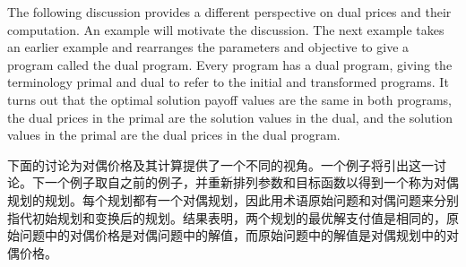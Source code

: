 \begin{original}
The following discussion provides a different perspective on dual prices and their computation. An example will motivate the discussion. The next example takes an earlier example and rearranges the parameters and objective to give a program called the dual program. Every program has a dual program, giving the terminology primal and dual to refer to the initial and transformed programs. It turns out that the optimal solution payoff values are the same in both programs, the dual prices in the primal are the solution values in the dual, and the solution values in the primal are the dual prices in the dual program.
\end{original}
\begin{translation}
下面的讨论为对偶价格及其计算提供了一个不同的视角。一个例子将引出这一讨论。下一个例子取自之前的例子，并重新排列参数和目标函数以得到一个称为对偶规划的规划。每个规划都有一个对偶规划，因此用术语原始问题和对偶问题来分别指代初始规划和变换后的规划。结果表明，两个规划的最优解支付值是相同的，原始问题中的对偶价格是对偶问题中的解值，而原始问题中的解值是对偶规划中的对偶价格。
\end{translation}

